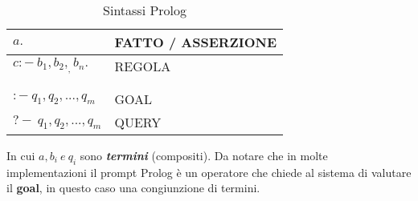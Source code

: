 \documentclass[11pt]{article}
\begin{document}
\begin{table}[ht] %
	\begin{center}
	\caption{Sintassi Prolog}
	\label{sintassiProlog}
	\begin{tabular}{l|l}

	$a.$ & \color{red}FATTO / ASSERZIONE\color{black} \\
	\hline
	$c :- \medspace b_1 , b_2 , _ , b_n . $ & \color{red}REGOLA\color{black} \\
	\\ \\

	$:- \medspace q_1 , q_2 , ... , q_m $ & \color{red}GOAL\color{black} \\
	\hline
	$?-\medspace q_1 , q_2 , ... , q_m $ & \color{red}QUERY\color{black} \\
	
	
	\end{tabular}
	\end{center}
\end{table}
In cui $a, b_i \medspace e \medspace  q_i $ sono \emph{\textbf{termini}} (compositi). 
Da notare che in molte implementazioni il prompt Prolog è un operatore che chiede al sistema di valutare il \textbf{goal}, in questo caso una congiunzione di termini. 
\end{document}

